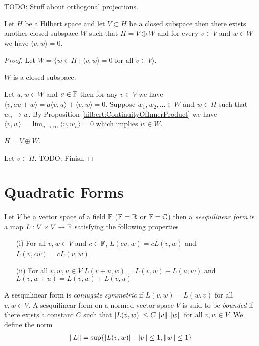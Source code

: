 TODO: Stuff about orthogonal projections.
\begin{prop}Let $H$ be a Hilbert space and let $V \subset H$ be a closed subspace then there exists another closed subspace $W$ such that $H = V \oplus W$ and for every $v \in V$ and $w \in W$ we have $\langle v, w \rangle = 0$.  
\end{prop}
\begin{proof}
Let $W = \lbrace w \in H \mid \langle v, w \rangle = 0 \text{ for all $v \in V$}  \rangle$.  

\begin{clm} $W$ is a closed subspace.  
\end{clm}
Let $u,w \in W$ and $a \in \mathbb{F}$ then for any $v \in V$ we have $\langle v, au + w \rangle = a \langle v, u \rangle + \langle v, w \rangle = 0$.  Suppose $w_1, w_2, \dotsc \in W$ and $w \in H$ such that $w_n \to w$.  By Proposition \ref{hilbert:ContinuityOfInnerProduct} we have $\langle v, w \rangle = \lim_{n \to \infty} \langle v, w_n \rangle = 0$ which implies $w \in W$.

\begin{clm} $H = V \oplus W$.
\end{clm}
Let $v \in H$.  
TODO: Finish
\end{proof}

\section{Quadratic Forms}


\begin{defn}Let $V$ be a vector space of a field $\mathbb{F}$ ($\mathbb{F} = \mathbb{R}$ or $\mathbb{F} = \mathbb{C}$) then a
  \emph{sesquilinear form} is a map $L : V \times V \to \mathbb{F}$ 
satisfying the following properties
\begin{itemize}
\item[(i)] For all $v,w \in V$ and $c \in \mathbb{F}$, $L(cv, w)= \overline{c} L(v,w)$ and $L(v,cw)= c L(v,w)$.
\item[(ii)] For all $v,w,u \in V$ $L(v + u, w) = L(v,w)+ L(u, w)$ and $L(v, w+u) = L(v,w) + L(v, u)$
\end{itemize}
A sesquilinear form is \emph{conjugate symmetric} if $L(v,w) = \overline{L(w,v)}$ for all $v, w \in V$.
A sesquilinear form on a normed vector space $V$ is said to be \emph{bounded} if there exists a constant $C$ such that $\left \vert L(v,w) \right \vert \leq C \left \lVert v \right \rVert \left \lVert w \right \rVert$ for all $v, w \in V$.   We define the norm 
\begin{align*}
\left \lVert L \right \rVert = \sup \lbrace \left \vert L(v,w) \right \vert \mid \left \lVert v \right \rVert \leq 1, \left \lVert w \right \rVert \leq 1 \rbrace
\end{align*}
\end{defn}

